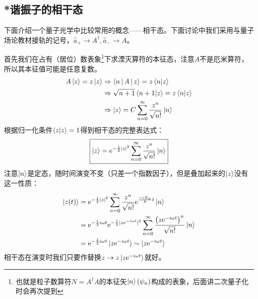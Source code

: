 \documentclass[a4paper,zihao=-4,linespread=1]{ctexrep}
\begin{document}
    \subsection{*谐振子的相干态}
    下面介绍一个量子光学中比较常用的概念——相干态。下面讨论中我们采用与量子场论教材接轨的记号，$\hat a_+\to A^\dagger,\hat a_-\to A$。
    
    首先我们在占有（居位）数表象\footnote{也就是粒子数算符$N=A^\dagger A$的本征矢$\ket{n}(\psi_n)$构成的表象，后面讲二次量子化时会再次提到}下求湮灭算符的本征态，注意$A$不是厄米算符，所以其本征值可能是任意复数。
    \begin{equation}
    	\begin{aligned}
    		A\ket{z}=z\ket{z}&\Rightarrow \Braket{n|A|z}=z\braket{n|z}\\
    		&\Rightarrow \sqrt{n+1}\braket{n+1|z}=z\braket{n|z}\\
    		&\Rightarrow \ket{z}=C\sum_{n=0}^{\infty}\frac{z^n}{\sqrt{n!}}\ket{n}
    	\end{aligned}
    \end{equation}
    根据归一化条件$\braket{z|z}=1$得到相干态的完整表达式：
    \begin{equation}
    	\boxed{
    		\ket{z}=\mathrm{e}^{-\frac{1}{2}|z|^2}\sum_{n=0}^{\infty}\frac{z^n}{\sqrt{n!}}\ket{n}
    	}
    \end{equation}
    注意$\ket{n}$是定态，随时间演变不变（只差一个指数因子），但是叠加起来的$\ket{z}$没有这一性质：
    \begin{equation}
    	\begin{aligned}
    		\ket{z(t)}&=\mathrm{e}^{-\frac{1}{2}|z|^2}\sum_{n=0}^{\infty}\frac{z^n}{\sqrt{n!}}\mathrm{e}^{\frac{-iE_n}{\hbar}t}\ket{n}\\
    		&=\mathrm{e}^{-\frac{1}{2}i\omega t}\mathrm{e}^{-\frac{1}{2}|z\mathrm{e}^{-i\omega t}|^2}\sum_{n=0}^{\infty}\frac{\left(z\mathrm{e}^{-i\omega t}\right)^n}{\sqrt{n!}}\ket{n}\\
    		&=\mathrm{e}^{-\frac{1}{2}i\omega t}\ket{z\mathrm{e}^{-i\omega t}}\sim\ket{z\mathrm{e}^{-i\omega t}}
    	\end{aligned}
    \end{equation}相干态在演变时我们只要作替换$z\to z\ket{z\mathrm{e}^{-i\omega t}}$就好。
\end{document}

